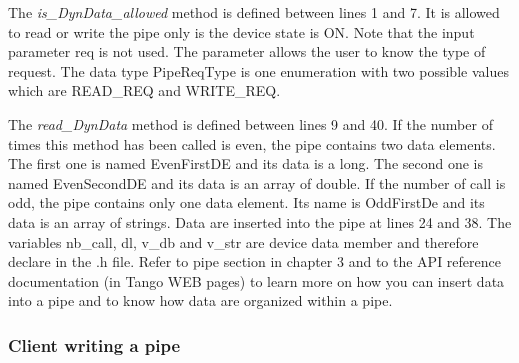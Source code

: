 The \emph{is\_DynData\_allowed} method is defined between lines 1
and 7. It is allowed to read or write the pipe only is the device
state is ON. Note that the input parameter req is not used. The parameter
allows the user to know the type of request. The data type PipeReqType
is one enumeration with two possible values which are READ\_REQ and
WRITE\_REQ.

The \emph{read\_DynData} method is defined between lines 9 and 40.
If the number of times this method has been called is even, the pipe
contains two data elements. The first one is named EvenFirstDE and
its data is a long. The second one is named EvenSecondDE and its data
is an array of double. If the number of call is odd, the pipe contains
only one data element. Its name is OddFirstDe and its data is an array
of strings. Data are inserted into the pipe at lines 24 and 38. The
variables nb\_call, dl, v\_db and v\_str are device data member and
therefore declare in the .h file. Refer to pipe section in chapter
3 and to the API reference documentation (in Tango WEB pages) to learn
more on how you can insert data into a pipe and to know how data are
organized within a pipe.


\subsubsection{Client writing a pipe}

